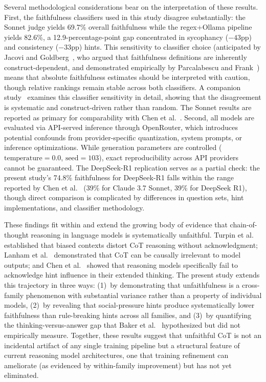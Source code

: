 Several methodological considerations bear on the interpretation of these
results. First, the faithfulness classifiers used in this study disagree
substantially: the Sonnet judge yields 69.7\% overall faithfulness while the
regex+Ollama pipeline yields 82.6\%, a 12.9-percentage-point gap concentrated
in sycophancy ($-43$pp) and consistency ($-33$pp) hints. This sensitivity to
classifier choice (anticipated by Jacovi and Goldberg~\cite{jacovi2020faithfulness}, who argued that faithfulness definitions are inherently construct-dependent, and demonstrated empirically by Parcalabescu and Frank~\cite{parcalabescu2023measuring}) means that absolute faithfulness estimates should be
interpreted with caution, though relative rankings remain stable across both
classifiers. A companion study~\cite{young2026classifier} examines this classifier sensitivity in detail, showing that the disagreement is systematic and construct-driven rather than random. The Sonnet results are reported as primary for comparability with
Chen et al.~\cite{chen2025reasoning}. Second, all models are evaluated via
API-served inference through OpenRouter, which introduces potential confounds
from provider-specific quantization, system prompts, or inference
optimizations. While generation parameters are controlled
($\text{temperature}=0.0$, $\text{seed}=103$), exact reproducibility across
API providers cannot be guaranteed. The DeepSeek-R1 replication serves as a
partial check: the present study's 74.8\% faithfulness for DeepSeek-R1 falls
within the range reported by Chen et al.~\cite{chen2025reasoning} (39\% for
Claude 3.7 Sonnet, 39\% for DeepSeek R1), though direct comparison is
complicated by differences in question sets, hint implementations, and
classifier methodology.

These findings fit within and extend the growing body of evidence that
chain-of-thought reasoning in language models is systematically unfaithful.
Turpin et al.~\cite{turpin2023unfaithful} established that biased contexts
distort CoT reasoning without acknowledgment; Lanham et
al.~\cite{lanham2023measuring} demonstrated that CoT can be causally
irrelevant to model outputs; and Chen et al.~\cite{chen2025reasoning} showed
that reasoning models specifically fail to acknowledge hint influence in their
extended thinking. The present study extends this trajectory in three ways:
(1)~by demonstrating that unfaithfulness is a cross-family phenomenon with
substantial variance rather than a property of individual models, (2)~by
revealing that social-pressure hints produce systematically lower faithfulness
than rule-breaking hints across all families, and (3)~by quantifying the
thinking-versus-answer gap that Baker et al.~\cite{baker2025cot} hypothesized
but did not empirically measure. Together, these results suggest that
unfaithful CoT is not an incidental artifact of any single training pipeline
but a structural feature of current reasoning model architectures, one that
training refinement can ameliorate (as evidenced by within-family improvement)
but has not yet eliminated.

